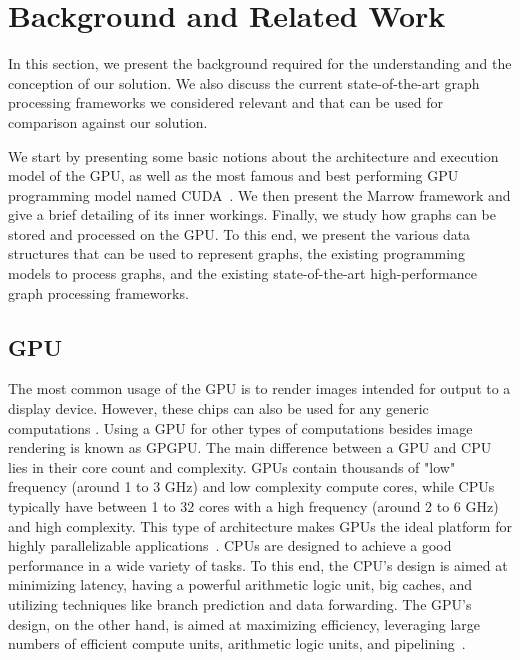 %
\glsresetall
\chapter{Background and Related Work}

In this section, we present the background required for the understanding and the conception of our solution. We also discuss the current state-of-the-art graph processing frameworks we considered relevant and that can be used for comparison against our solution.

We start by presenting some basic notions about the architecture and execution model of the \gls{GPU}, as well as the most famous and best performing \gls{GPU} programming model named \gls{CUDA}~\cite{paper:cuda}. 
%
We then present the Marrow framework and give a brief detailing of its inner workings. 
%
Finally, we study how graphs can be stored and processed on the \gls{GPU}. To this end, we present the various data structures that can be used to represent graphs, the existing programming models to process graphs, and the existing state-of-the-art high-performance graph processing frameworks.

\section{GPU}

The most common usage of the \gls{GPU} is to render images intended for output to a display device. However, these chips can also be used for any generic computations
. Using a \gls{GPU} for other types of computations besides image rendering is known as \gls{GPGPU}. The main difference between a \gls{GPU} and \gls{CPU} lies in their core count and complexity. \gls{GPU}s contain thousands of "low" frequency (around 1 to 3 GHz) and low complexity compute cores, while \gls{CPU}s typically have between 1 to 32 cores with a high frequency (around 2 to 6 GHz) and high complexity. This type of architecture makes \gls{GPU}s the ideal platform for highly parallelizable applications~\cite{paper:cuda}. \gls{CPU}s are designed to achieve a good performance in a wide variety of tasks. To this end, the \gls{CPU}'s design is aimed at minimizing latency, having a powerful arithmetic logic unit, big caches, and utilizing techniques like branch prediction and data forwarding. The \gls{GPU}'s design, on the other hand, is aimed at maximizing efficiency, leveraging large numbers of efficient compute units, arithmetic logic units, and pipelining~\cite{site:nvidiaCudaGuide}.

